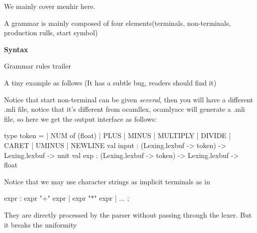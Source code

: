 
We mainly cover menhir here.

A grammar is mainly composed of four elements(terminals,
non-terminals, production rulls, start symbol)

\textbf{Syntax}


\begin{bluetext}
    Grammar rules 
    trailer 
\end{bluetext}


A tiny example as follows (It has a subtle bug, readers should find it)  

Notice that start non-terminal can be given \textit{several}, then you will
have a different .mli file, notice that it's different from ocamllex,
ocamlyacc will generate a .mli file, so here we get the output
interface as follows:

\begin{bluetext}
\end{bluetext}

\begin{bluecode}
type token =
  | NUM of (float)
  | PLUS
  | MINUS
  | MULTIPLY
  | DIVIDE
  | CARET
  | UMINUS
  | NEWLINE
val input :
  (Lexing.lexbuf  -> token) -> Lexing.lexbuf -> unit
val exp :
  (Lexing.lexbuf  -> token) -> Lexing.lexbuf -> float
\end{bluecode}

Notice that we may use character strings as implicit terminals as in 
\begin{redcode}
expr : expr "+" expr {}
     | expr "*" expr {}
     | ... ;
\end{redcode}
They are directly processed by the parser without passing through the
lexer. But it breaks the uniformity


